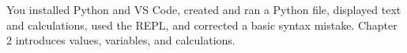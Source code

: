 \begin{tcolorbox}[title=Part I summary,colframe=orange,colback=white,arc=2mm]
You installed Python and VS Code, created and ran a Python file, displayed text
and calculations, used the REPL, and corrected a basic syntax mistake. Chapter
2 introduces values, variables, and calculations.
\end{tcolorbox}

